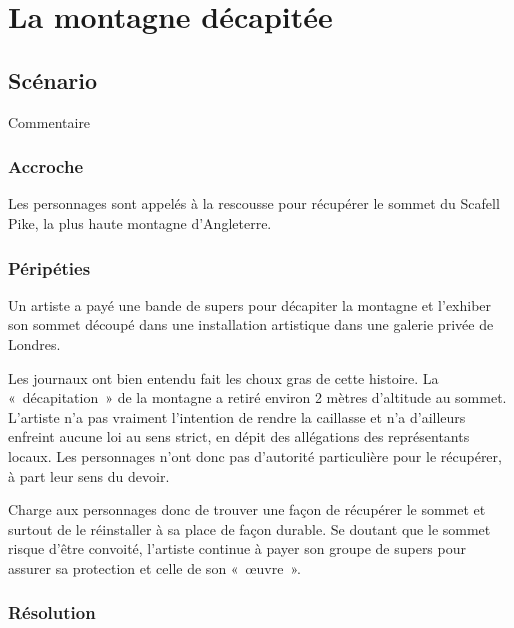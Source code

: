 \chapter{La montagne décapitée}

\section{Scénario}

Commentaire

\subsection{Accroche}

Les personnages sont appelés à la rescousse pour récupérer le sommet du Scafell Pike, la plus haute montagne d'Angleterre.

\subsection{Péripéties}

 Un artiste a payé une bande de supers pour décapiter la montagne et l'exhiber son sommet découpé dans une installation artistique dans une galerie privée de Londres.

Les journaux ont bien entendu fait les choux gras de cette histoire. La « décapitation » de la montagne a retiré environ 2 mètres d'altitude au sommet. L'artiste n'a pas vraiment l'intention de rendre la caillasse et n'a d'ailleurs enfreint aucune loi au sens strict, en dépit des allégations des représentants locaux. Les personnages n'ont donc pas d'autorité particulière pour le récupérer, à part leur sens du devoir.

Charge aux personnages donc de trouver une façon de récupérer le sommet et surtout de le réinstaller à sa place de façon durable. Se doutant que le sommet risque d'être convoité, l'artiste continue à payer son groupe de supers pour assurer sa protection et celle de son « œuvre ».


\subsection{Résolution}

